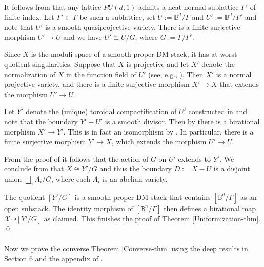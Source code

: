 \documentclass[a4paper]{amsart}
\theoremstyle{definition}
\begin{document}
It follows from \cite[Theorem 6.11]{Rag72} that any lattice ${PU}(d,1)$ admits a neat normal sublattice $\Gamma'$ of finite index. Let $\Gamma'\subset\Gamma$ be such a sublattice, set $U:=\mathbb{B}^d/\Gamma$ and $U':=\mathbb{B}^d/\Gamma'$ and note that $U'$ is a smooth quasiprojective variety. There is a finite surjective morphism $U'\to U$ and we have $U'\cong U/G$, where $G:=\Gamma/\Gamma'$.

Since $X$ is the moduli space of a smooth proper DM-stack, it has at worst quotient singularities. Suppose that $X$ is projective and let $X'$ denote the normalization of $X$ in the function field of $U'$ (see, e.g., \cite[Chapter XII, Section 9]{acgh2}). Then $X'$ is a normal projective variety, and there is a finite surjective morphism $X'\to X$ that extends the morphism $U'\to U$.

Let $Y'$ denote the (unique) toroidal compactification of $U'$ constructed in \cite[Chapter 5]{AMRT10} and note that the boundary $Y'-U'$ is a smooth divisor. Then by \cite[Lemma A.4]{dengcadorel} there is a birational morphism $X'\to Y'$. This is in fact an isomorphism by \cite[Lemma A.11]{dengcadorel}. In particular, there is a finite surjective morphism $Y'\to X$, which extends the morphism $U'\to U$. 

From the proof of \cite[Proposition A.1]{dengcadorel} it follows that the action of $G$ on $U'$ extends to $Y'$. We conclude from \cite[Lemmas A.13 and A.14]{dengcadorel} that $X\cong Y'/G$ and thus the boundary $D:=X-U$ is a disjoint union $\bigsqcup_iA_i/G$, where each $A_i$ is an abelian variety. 

The quotient $[Y'/G]$ is a smooth proper DM-stack that contains $[\mathbb{B}^d/\Gamma]$ as an open substack. The identity morphism of $[\mathbb{B}^n/\Gamma]$ then defines a birational map $\mathscr{X}\dashrightarrow[Y'/G]$ as claimed. This finishes the proof of Theorem \ref{Uniformization-thm}.
\qed\\
\\
Now we prove the converse Theorem \ref{Converse-thm} using the deep results in Section 6 and the appendix of \cite{dengcadorel}.
\end{document}
